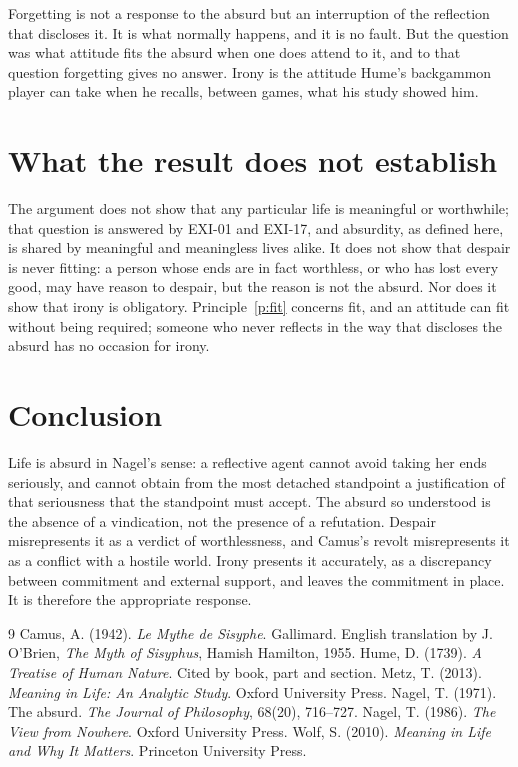 \documentclass{situationist-preprint}
\begin{document}
\begin{reply}
Forgetting is not a response to the absurd but an interruption of the reflection that discloses it. It is what normally happens, and it is no fault. But the question was what attitude fits the absurd when one does attend to it, and to that question forgetting gives no answer. Irony is the attitude Hume's backgammon player can take when he recalls, between games, what his study showed him.
\end{reply}

\section{What the result does not establish}

The argument does not show that any particular life is meaningful or worthwhile; that question is answered by EXI-01 and EXI-17, and absurdity, as defined here, is shared by meaningful and meaningless lives alike. It does not show that despair is never fitting: a person whose ends are in fact worthless, or who has lost every good, may have reason to despair, but the reason is not the absurd. Nor does it show that irony is obligatory. Principle~\ref{p:fit} concerns fit, and an attitude can fit without being required; someone who never reflects in the way that discloses the absurd has no occasion for irony.

\section{Conclusion}

Life is absurd in Nagel's sense: a reflective agent cannot avoid taking her ends seriously, and cannot obtain from the most detached standpoint a justification of that seriousness that the standpoint must accept. The absurd so understood is the absence of a vindication, not the presence of a refutation. Despair misrepresents it as a verdict of worthlessness, and Camus's revolt misrepresents it as a conflict with a hostile world. Irony presents it accurately, as a discrepancy between commitment and external support, and leaves the commitment in place. It is therefore the appropriate response.

\begin{thebibliography}{9}\small
{} Camus, A. (1942). \emph{Le Mythe de Sisyphe}. Gallimard. English translation by J. O'Brien, \emph{The Myth of Sisyphus}, Hamish Hamilton, 1955.
 Hume, D. (1739). \emph{A Treatise of Human Nature}. Cited by book, part and section.
 Metz, T. (2013). \emph{Meaning in Life: An Analytic Study}. Oxford University Press.
 Nagel, T. (1971). The absurd. \emph{The Journal of Philosophy}, 68(20), 716--727.
 Nagel, T. (1986). \emph{The View from Nowhere}. Oxford University Press.
 Wolf, S. (2010). \emph{Meaning in Life and Why It Matters}. Princeton University Press.
\end{thebibliography}
\end{document}
